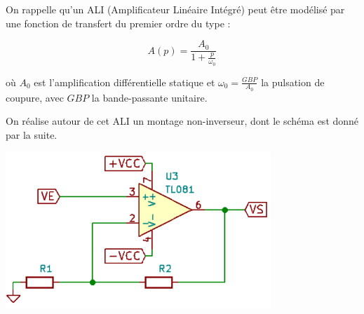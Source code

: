On rappelle qu'un ALI (Amplificateur Linéaire Intégré) peut être modélisé par une fonction de transfert du premier ordre du type : 

$$A(p) = \frac{A_0}{1 + \frac{p}{\omega_0}}$$

où $A_0$ est l'amplification différentielle statique et $\omega_0 = \frac{GBP}{A_0}$ la pulsation de coupure, avec $GBP$ la bande-passante unitaire.

On réalise autour de cet ALI un montage non-inverseur, dont le schéma est donné par la suite.

\begin{center}
	\includegraphics[width=10cm]{images/TD/noninverseur.png}
\end{center}

